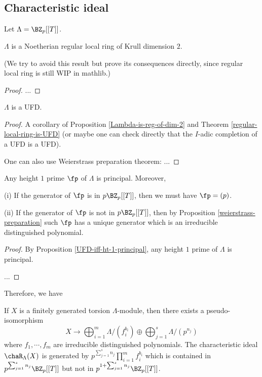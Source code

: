 \subsection{Characteristic ideal}

Let $\Lambda=\BZ_p[[T]]$.

\begin{prop}
\label{Lambda-is-reg-of-dim-2}
$\Lambda$ is a
Noetherian regular local ring of Krull dimension $2$.

(We try to avoid this result but prove its consequences directly,
since regular local ring is still WIP in mathlib.)
\end{prop}

\begin{proof}
...
\end{proof}

\begin{cor}
\label{Lambda-is-UFD}
$\Lambda$ is a UFD.
\end{cor}

\begin{proof}
A corollary of Proposition \ref{Lambda-is-reg-of-dim-2} and
Theorem \ref{regular-local-ring-is-UFD}
(or maybe one can check directly that the $I$-adic completion of a UFD is a UFD).

One can also use Weierstrass preparation theorem: ...
\end{proof}

\begin{cor}
\label{Lambda-ht-1-principal}
Any height $1$ prime $\fp$ of $\Lambda$
is principal. Moreover,

{\rm(i)}
If the generator of $\fp$ is in $p\BZ_p[[T]]$, then
we must have $\fp=(p)$.

{\rm(ii)}
If the generator of $\fp$ is not in $p\BZ_p[[T]]$, then
by Proposition \ref{weierstrass-preparation} such $\fp$
has a unique generator which is an irreducible distinguished polynomial.
\end{cor}

\begin{proof}
By Proposition \ref{UFD-iff-ht-1-principal}, any height $1$ prime of $\Lambda$
is principal.

...
\end{proof}

Therefore, we have

\begin{prop}
\label{Lambda-module-structure}
If $X$ is a finitely generated torsion $\Lambda$-module,
then there exists a pseudo-isomorphism
$$
X\to\bigoplus_{i=1}^m\Lambda/(f_i^{b_i})\oplus\bigoplus_{j=1}^s\Lambda/(p^{n_j})
$$
where $f_1,\cdots,f_m$ are irreducible distinguished polynomials.
The characteristic ideal $\chaR_\Lambda(X)$ is generated by
$p^{\sum_{j=1}^sn_j}\prod_{i=1}^mf_i^{b_i}$
which is contained in $p^{\sum_{j=1}^sn_j}\BZ_p[[T]]$
but not in $p^{1+\sum_{j=1}^sn_j}\BZ_p[[T]]$.
\end{prop}

